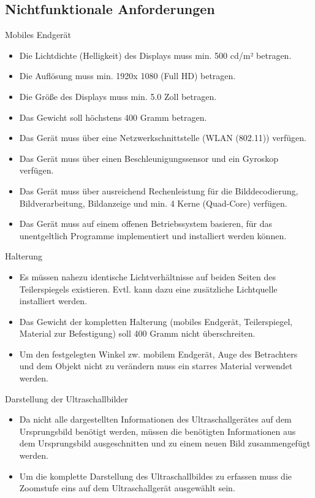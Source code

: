 \subsection{Nichtfunktionale Anforderungen} \label{NichtFunkAnf}
\begin{minipage}{\textwidth}
Mobiles Endgerät
\begin{itemize}
\item Die Lichtdichte (Helligkeit) des Displays muss min. 500 cd/m² betragen.
\item Die Auflösung muss min. 1920x 1080 (Full HD) betragen.
\item Die Größe des Displays muss min. 5.0 Zoll betragen.
\item Das Gewicht soll höchstens 400 Gramm betragen.
\item Das Gerät muss über eine Netzwerkschnittstelle (WLAN (802.11)) verfügen.
\item Das Gerät muss über einen Beschleunigungssensor und ein Gyroskop verfügen.
\item Das Gerät muss über ausreichend Rechenleistung für die Bilddecodierung, Bildverarbeitung, Bildanzeige und min. 4 Kerne (Quad-Core) verfügen.
\item Das Gerät muss auf einem offenen Betriebssystem basieren, für das unentgeltlich Programme implementiert und installiert werden können.
\end{itemize}
\end{minipage}

\begin{minipage}{\textwidth}
Halterung
\begin{itemize}
\item Es müssen nahezu identische Lichtverhältnisse auf beiden Seiten des Teilerspiegels existieren. Evtl. kann dazu eine zusätzliche Lichtquelle installiert werden.
\item Das Gewicht der kompletten Halterung (mobiles Endgerät, Teilerspiegel, Material zur Befestigung)  soll 400 Gramm nicht überschreiten.
\item Um den festgelegten Winkel zw. mobilem Endgerät, Auge des Betrachters und dem Objekt nicht zu verändern muss ein starres Material verwendet werden.
\end{itemize}
\end{minipage}

\begin{minipage}{\textwidth}
Darstellung der Ultraschallbilder
\begin{itemize}
\item Da nicht alle dargestellten Informationen des Ultraschallgerätes auf dem Ursprungsbild benötigt werden, müssen die benötigten Informationen aus dem Ursprungsbild ausgeschnitten und zu einem neuen Bild zusammengefügt werden.
\item Um die komplette Darstellung des Ultraschallbildes zu erfassen muss die Zoomstufe eins auf dem Ultraschallgerät ausgewählt sein.
\end{itemize}
\end{minipage}
